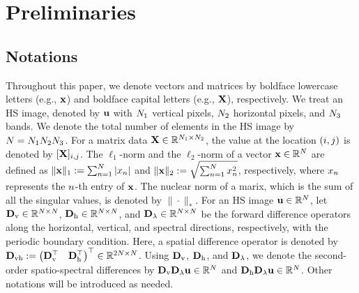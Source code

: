 \section{Preliminaries}
\label{sec:Preliminaries}

\subsection{Notations}
\label{subsec:Notations}
Throughout this paper, we denote vectors and matrices by boldface lowercase letters (e.g., $\mathbf{x}$) and boldface capital letters (e.g., $\mathbf{X}$), respectively.
We treat an HS image, denoted by $\mathbf{u}$ with $N_{1}$ vertical pixels, $N_{2}$ horizontal pixels, and $N_{3}$ bands.
We denote the total number of elements in the HS image by $N = N_{1} N_{2} N_{3}$.
For a matrix data $\mathbf{X} \in \mathbb{R}^{N_{1} \times N_{2}}$, the value at the location $(i, j)$ is denoted by $[\mathbf{X}]_{i,j}$.
The $\ell_{1}$-norm and the $\ell_{2}$-norm of a vector $\mathbf{x} \in \mathbb{R}^{N}$ are defined as $\| \mathbf{x} \|_{1} := \sum_{n=1}^{N} | x_{n} |$ and $\| \mathbf{x} \|_{2} := \sqrt{\sum_{n=1}^{N} x_{n}^{2}}$, respectively, where  $x_{n}$ represents the $n$-th entry of $\mathbf{x}$.
The nuclear norm of a marix, which is the sum of all the singular values, is denoted by $\| \cdot \|_{*}$.
For an HS image $\mathbf{u} \in \mathbb{R}^{N}$, let $\mathbf{D}_{\text{v}} \in \mathbb{R}^{N \times N}$, $\mathbf{D}_{\text{h}} \in \mathbb{R}^{N \times N}$, and $\mathbf{D}_{\lambda} \in \mathbb{R}^{N \times N}$ be the forward difference operators along the horizontal, vertical, and spectral directions, respectively, with the periodic boundary condition.
Here, a spatial difference operator is denoted by $\mathbf{D}_{\text{vh}} := \begin{pmatrix} \mathbf{D}_{\text{v}}^{\top} & \mathbf{D}_{\text{h}}^{\top} \end{pmatrix}^{\top} \in \mathbb{R}^{2 N \times N}$. 
Using $\mathbf{D}_{\text{v}}$, $\mathbf{D}_{\text{h}}$, and $\mathbf{D}_{\lambda}$, we denote the second-order spatio-spectral differences by $\mathbf{D}_{\text{v}} \mathbf{D}_{\lambda} \mathbf{u} \in \mathbb{R}^{N}$ and $\mathbf{D}_{\text{h}} \mathbf{D}_{\lambda} \mathbf{u} \in \mathbb{R}^{N}$.
Other notations will be introduced as needed.



